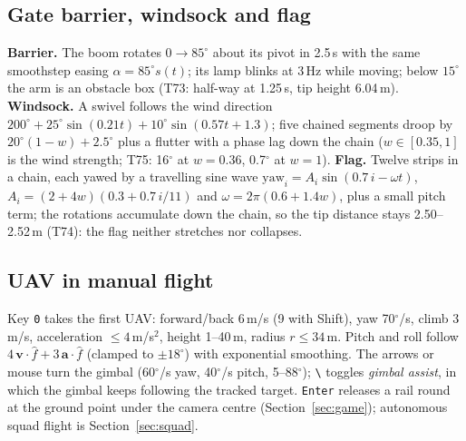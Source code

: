 \subsection{Gate barrier, windsock and flag}
\textbf{Barrier.} The boom rotates $0\to85^\circ$ about its pivot in 2.5\,s with the same smoothstep easing
$\alpha=85^\circ s(t)$; its lamp blinks at 3\,Hz while moving; below $15^\circ$ the arm is an obstacle box (T73: half-way at 1.25\,s, tip height 6.04\,m). \textbf{Windsock.} A swivel follows the wind direction $200^\circ+25^\circ\sin(0.21t)+10^\circ\sin(0.57t+1.3)$; five chained
segments droop by $20^\circ(1-w)+2.5^\circ$ plus a flutter with a phase lag down the chain ($w\in[0.35,1]$ is the wind strength; T75: 16$^\circ$ at $w=0.36$, 0.7$^\circ$ at $w=1$). \textbf{Flag.} Twelve strips in a chain, each yawed by a travelling
sine wave $\mathrm{yaw}_i=A_i\sin(0.7\,i-\omega t)$, $A_i=(2+4w)(0.3+0.7\,i/11)$ and $\omega=2\pi(0.6+1.4w)$, plus a small pitch term; the rotations accumulate down the chain, so the tip distance stays 2.50--2.52\,m (T74): the flag neither stretches nor collapses.

\subsection{UAV in manual flight}
Key \texttt{0} takes the first UAV: forward/back 6\,m/s (9 with Shift), yaw 70$^\circ$/s, climb 3\,m/s, acceleration $\le4$\,m/s$^2$, height 1--40\,m, radius $r\le34$\,m. Pitch and roll follow
$4\,\mathbf v\cdot\hat f+3\,\mathbf a\cdot\hat f$ (clamped to $\pm18^\circ$) with exponential smoothing. The arrows or mouse turn the gimbal (60$^\circ$/s yaw, 40$^\circ$/s pitch,
5--88$^\circ$); \texttt{\textbackslash} toggles \emph{gimbal assist}, in which the gimbal keeps following the tracked target. \texttt{Enter} releases a rail round at the ground point
under the camera centre (Section~\ref{sec:game}); autonomous squad flight is Section~\ref{sec:squad}.

